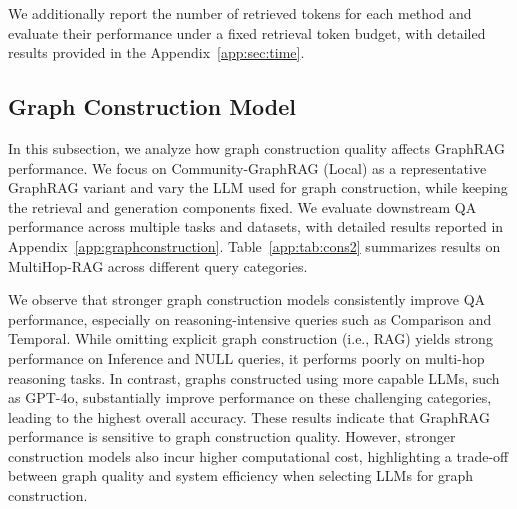{{We additionally report the number of retrieved tokens for each method and evaluate their performance under a fixed retrieval token budget, with detailed results provided in the Appendix~\ref{app:sec:time}.


\subsection{Graph Construction Model}
In this subsection, we analyze how graph construction quality affects GraphRAG performance. We focus on Community-GraphRAG (Local) as a representative GraphRAG variant and vary the LLM used for graph construction, while keeping the retrieval and generation components fixed. We evaluate downstream QA performance across multiple tasks and datasets, with detailed results reported in Appendix~\ref{app:graphconstruction}. Table~\ref{app:tab:cons2} summarizes results on MultiHop-RAG across different query categories.

\begin{table}[!htb] 
\centering 
\caption{Impact of graph construction models on the MultiHop-RAG dataset using Llama~3.1--70B-Instruct.} 
\label{app:tab:cons2} 
\vspace{-0.1in}
\vspace{-0.1in}
\end{table}

We observe that stronger graph construction models consistently improve QA performance, especially on reasoning-intensive queries such as Comparison and Temporal. While omitting explicit graph construction (i.e., RAG) yields strong performance on Inference and NULL queries, it performs poorly on multi-hop reasoning tasks. In contrast, graphs constructed using more capable LLMs, such as GPT-4o, substantially improve performance on these challenging categories, leading to the highest overall accuracy.
These results indicate that GraphRAG performance is sensitive to graph construction quality. However, stronger construction models also incur higher computational cost, highlighting a trade-off between graph quality and system efficiency when selecting LLMs for graph construction.

}}
